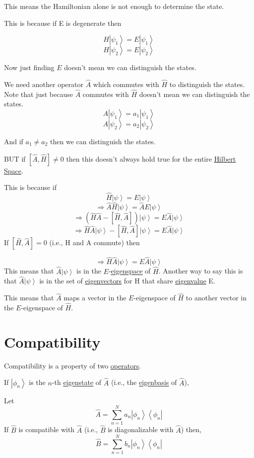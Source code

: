 \documentclass[
]{article}
\let\oldhyperref\hyperref
\renewcommand{\hyperref}[2][]{\oldhyperref[#1]{\underline{#2}}}
\providecommand{\ket}[1]{\left\lvert #1 \right\rangle}
\providecommand{\bra}[1]{\left\langle #1 \right\rvert}
\providecommand{\Rarr}{\Rightarrow}
\begin{document}
This means the Hamiltonian alone is not enough to determine the state.

This is because if E is degenerate then

\[
	H\ket{\psi_1}= E\ket{\psi_1}
\]
\[
	H\ket{\psi_2}= E\ket{\psi_2}
\]

Now just finding \(E\) doesn't mean we can distinguish the states.

We need another operator \(\hat{A}\) which commutes with \(\hat{H}\) to distinguish the states. Note that just because \(\hat{A}\) commutes with \(\hat{H}\) doesn't mean we can distinguish the states.
\[
	A\ket{\psi_1}= a_1\ket{\psi_1}
\]
\[
	A\ket{\psi_2}= a_2\ket{\psi_2}
\]

And if \(a_1\neq a_2\) then we can distinguish the states.

BUT if \([\hat{A},\hat{H}]\neq0\) then this doesn't always hold true for the entire \hyperref[hilbert-spaces]{Hilbert Space}.

This is because if
\[
	\hat{H}\ket{\psi}= E\ket{\psi}
\]
\[
	\Rarr \hat{A}\hat{H}\ket{\psi}= \hat{A}E\ket{\psi}
\]
\[
	\Rarr (\hat{H}\hat{A}-[\hat{H},\hat{A}])\ket{\psi} = E\hat{A}\ket{\psi}
\]
\[
	\Rarr \hat{H}\hat{A}\ket{\psi} - [\hat{H},\hat{A}]\ket{\psi}= E\hat{A}\ket{\psi}
\]
If \([\hat{H},\hat{A}]=0\) (i.e., H and A commute) then

\[
	\Rarr \hat{H}\hat{A}\ket{\psi} = E\hat{A}\ket{\psi}
\]
This means that \(\hat{A}\ket{\psi}\) is in the \(E\)-\hyperref[eigenspaces]{eigenspace} of \(\hat{H}\). Another way to say this is that \(\hat{A}\ket{\psi}\) is in the set of \hyperref[eigenvectorseigenvalues]{eigenvectors} for H that share \hyperref[eigenvectorseigenvalues]{eigenvalue} E.

This means that \(\hat{A}\) maps a vector in the \(E\)-eigenspace of \(\hat{H}\) to another vector in the \(E\)-eigenspace of \(\hat{H}\).



\section{Compatibility}\label{compatibility}
Compatibility is a property of two \hyperref[operators]{operators}.

If \(\ket{\phi_n}\) is the \(n\)-th \hyperref[eigenstates]{eigenstate} of \(\hat{A}\) (i.e., the \hyperref[eigenbasis]{eigenbasis} of \(\hat{A}\)),

Let
\[
	\hat{A}=\sum_{n=1}^N a_n\ket{\phi_n}\bra{\phi_n}
\]
If \(\hat{B}\) is compatible with \(\hat{A}\) (i.e., \(\hat{B}\) is diagonalizable with \(\hat{A}\)) then,
\[
	\hat{B}=\sum_{n=1}^N b_n\ket{\phi_n}\bra{\phi_n}
\]
\end{document}
